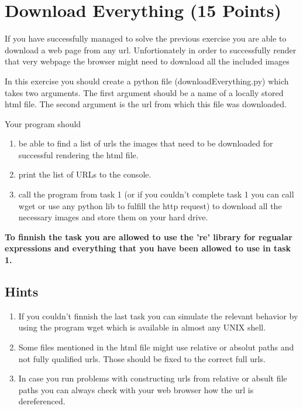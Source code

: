 \documentclass{WeSTassignment}
\begin{document}

\section{Download Everything (15 Points)}

If you have successfully managed to solve the previous exercise you are able to download a web page from any url. Unfortionately in order to successfully render that very webpage the browser might need to download all the included images

In this exercise you should create a python file (downloadEverything.py) which takes two arguments. The first argument should be a name of a locally stored html file. The second argument is the url from which this file was downloaded.

Your program should 
\begin{enumerate}
\item be able to find a list of urls the images that need to be downloaded for successful rendering the html file.
\item print the list of URLs to the console.
\item call the program from task 1 (or if you couldn't complete task 1 you can call wget or use any python lib to fulfill the http request) to download all the necessary images and store them on your hard drive.
\end{enumerate}

\textbf{To finnish the task you are allowed to use the 're' library for regualar expressions and everything that you have been allowed to use in task 1.}

\subsection{Hints}
\begin{enumerate}
\item If you couldn't finnish the last task you can simulate the relevant behavior by using the program wget which is available in almost any UNIX shell. 
\item Some files mentioned in the html file might use relative or absolut paths and not fully qualified urls. Those should be fixed to the correct full urls. 
\item In case you run problems with constructing urls from relative or absult file paths you can always check with your web browser how the url is dereferenced. \\
\end{enumerate}
\end{document}
